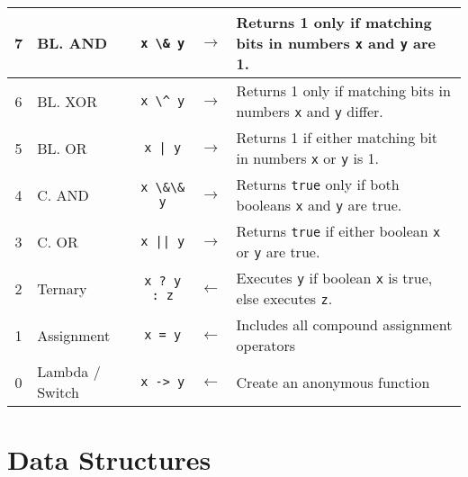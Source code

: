 \documentclass{article}
\begin{document}
\begin{center}
\begin{tabularx}{\textwidth}{clccX}
7 & BL. AND           & \lstinline|x \& y|    & \(\to\) & Returns 1 only if matching bits in numbers \lstinline|x| and \lstinline|y| are 1. \\\midrule
6 & BL. XOR           & \lstinline|x \^ y|    & \(\to\) & Returns 1 only if matching bits in numbers \lstinline|x| and \lstinline|y| differ.\\\midrule
5 & BL. OR            & \lstinline+x | y+     & \(\to\) & Returns 1 if either matching bit in numbers \lstinline|x| or \lstinline|y| is 1.\\\midrule
4 & C. AND            & \lstinline|x \&\& y|  & \(\to\) & Returns \lstinline|true| only if both booleans \lstinline|x| and \lstinline|y| are true.\\\midrule
3 & C. OR             & \lstinline+x || y+    & \(\to\) & Returns \lstinline|true| if either boolean \lstinline|x| or \lstinline|y| are true.\\\midrule
2 & Ternary           & \lstinline|x ? y : z| & \(\gets\) & Executes \lstinline|y| if boolean \lstinline|x| is true, else executes \lstinline|z|.\\\midrule
1 & Assignment        & \lstinline!x = y!     & \(\gets\) & Includes all compound assignment operators \\\midrule
0 & Lambda / Switch   & \lstinline|x -> y|    & \(\gets\) & Create an anonymous function\\\bottomrule
\end{tabularx}\end{center}

\section{Data Structures}
\end{document}
